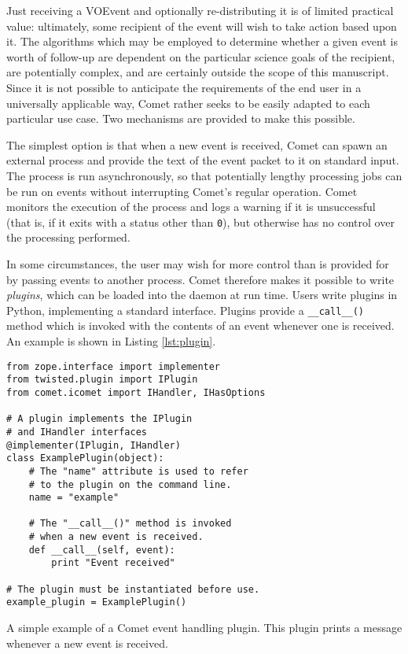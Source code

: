 \documentclass[5p,authoryear]{elsarticle}
\begin{document}
Just receiving a VOEvent and optionally re-distributing it is of limited
practical value: ultimately, some recipient of the event will wish to take
action based upon it. The algorithms which may be employed to determine
whether a given event is worth of follow-up are dependent on the particular
science goals of the recipient, are potentially complex, and are certainly
outside the scope of this manuscript. Since it is not possible to anticipate
the requirements of the end user in a universally applicable way, Comet rather
seeks to be easily adapted to each particular use case. Two mechanisms are
provided to make this possible.

The simplest option is that when a new event is received, Comet can spawn an
external process and provide the text of the event packet to it on standard
input.  The process is run asynchronously, so that potentially lengthy
processing jobs can be run on events without interrupting Comet's regular
operation.  Comet monitors the execution of the process and logs a warning if
it is unsuccessful (that is, if it exits with a status other than \texttt{0}),
but otherwise has no control over the processing performed.

In some circumstances, the user may wish for more control than is provided for
by passing events to another process. Comet therefore makes it possible to
write \textit{plugins}, which can be loaded into the daemon at run time.
Users write plugins in Python, implementing a standard interface. Plugins
provide a \texttt{\_\_call\_\_()} method which is invoked with the contents of
an event whenever one is received. An example is shown in Listing
\ref{lst:plugin}.

\begin{listing}
\begin{verbatim}
from zope.interface import implementer
from twisted.plugin import IPlugin
from comet.icomet import IHandler, IHasOptions

# A plugin implements the IPlugin
# and IHandler interfaces
@implementer(IPlugin, IHandler)
class ExamplePlugin(object):
    # The "name" attribute is used to refer
    # to the plugin on the command line.
    name = "example"

    # The "__call__()" method is invoked
    # when a new event is received.
    def __call__(self, event):
        print "Event received"

# The plugin must be instantiated before use.
example_plugin = ExamplePlugin()
\end{verbatim}
\caption{A simple example of a Comet event handling plugin. This plugin prints
a message whenever a new event is received.}
\label{lst:plugin}
\end{listing}
\end{document}
